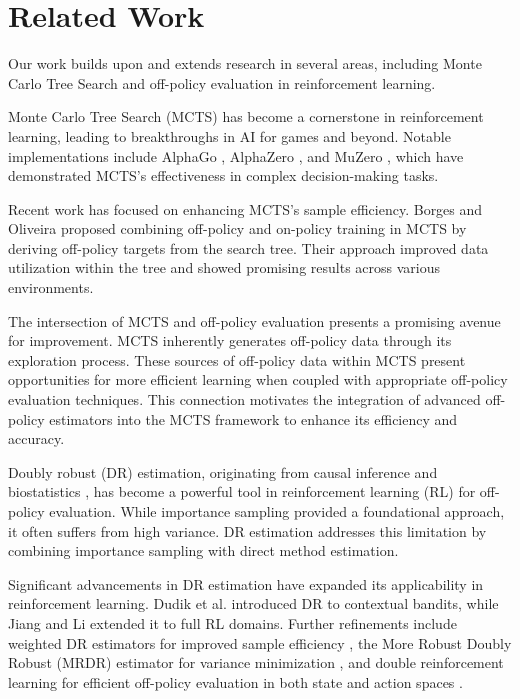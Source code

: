 \section{Related Work}
Our work builds upon and extends research in several areas, including Monte Carlo Tree Search and off-policy evaluation in reinforcement learning.

Monte Carlo Tree Search (MCTS) \cite{coulom2006efficient} has become a cornerstone in reinforcement learning, leading to breakthroughs in AI for games and beyond. Notable implementations include AlphaGo \cite{silver2016mastering}, AlphaZero \cite{silver2018general}, and MuZero \cite{schrittwieser2020mastering}, which have demonstrated MCTS's effectiveness in complex decision-making tasks.

Recent work has focused on enhancing MCTS's sample efficiency. Borges and Oliveira \cite{borges2021combiningonpolicytrainingmodelbased} proposed combining off-policy and on-policy training in MCTS by deriving off-policy targets from the search tree. Their approach improved data utilization within the tree and showed promising results across various environments.

The intersection of MCTS and off-policy evaluation presents a promising avenue for improvement. MCTS inherently generates off-policy data through its exploration process. These sources of off-policy data within MCTS present opportunities for more efficient learning when coupled with appropriate off-policy evaluation techniques. This connection motivates the integration of advanced off-policy estimators into the MCTS framework to enhance its efficiency and accuracy.

Doubly robust (DR) estimation, originating from causal inference and biostatistics \cite{robins1995semiparametric}, has become a powerful tool in reinforcement learning (RL) for off-policy evaluation. While importance sampling \cite{precup2000eligibility} provided a foundational approach, it often suffers from high variance. DR estimation addresses this limitation by combining importance sampling with direct method estimation.

Significant advancements in DR estimation have expanded its applicability in reinforcement learning. Dudik et al. \cite{dudik2011doubly} introduced DR to contextual bandits, while Jiang and Li \cite{jiang2016doubly} extended it to full RL domains. Further refinements include weighted DR estimators for improved sample efficiency \cite{thomas2016data}, the More Robust Doubly Robust (MRDR) estimator for variance minimization \cite{farajtabar2018more}, and double reinforcement learning for efficient off-policy evaluation in both state and action spaces \cite{kallus2020double}.

